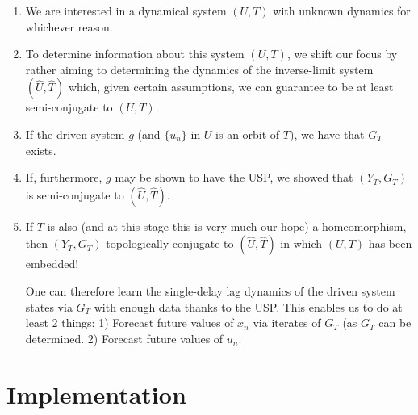 \documentclass[12 pt]{article}
\begin{document}
\vspace{-8mm}
\begin{enumerate}
\item We are interested in a dynamical system $(U,T)$ with unknown dynamics for whichever reason.
\item To determine information about this system $(U,T)$, we shift our focus by rather aiming to determining the dynamics of the inverse-limit system $(\widehat{U}, \widehat{T})$ which, given certain assumptions, we can guarantee to be at least semi-conjugate to $(U,T)$.
\item If the driven system $g$ (and $\{u_n\}$ in $U$  is an orbit of $T$), we have that $G_T$ exists. 
\item If, furthermore, $g$ may be shown to have the USP, we showed that $(Y_T, G_T)$ is semi-conjugate to $(\widehat{U}, \widehat{T})$.
\item If $T$ is also (and at this stage this is very much our hope) a homeomorphism, then $(Y_T, G_T)$ topologically conjugate to $(\widehat{U}, \widehat{T})$ in which $(U,T)$ has been embedded! 
 
One can therefore learn the single-delay lag dynamics of the driven system states via $G_T$ with enough data thanks to the USP. This enables us to do at least 2 things: 1) Forecast future values of $x_n$ via iterates of $G_T$ (as $G_T$ can be determined. 2) Forecast future values of $u_n$. 

\end{enumerate}



\section{Implementation} \label{sect5}
 
 



\vspace{-1cm}


\end{document}
